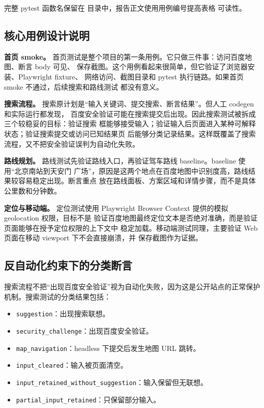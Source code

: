\documentclass[UTF8,a4paper,12pt]{ctexart}
\begin{document}
完整 pytest 函数名保留在  目录中，报告正文使用用例编号提高表格
可读性。

\subsection{核心用例设计说明}

\textbf{首页 smoke。}
首页测试是整个项目的第一条用例。它只做三件事：访问百度地图、断言 body 可见、
保存截图。这个用例看起来很简单，但它验证了浏览器安装、Playwright fixture、
网络访问、截图目录和 pytest 执行链路。如果首页 smoke 不通过，后续搜索和路线测试
都没有意义。

\textbf{搜索流程。}
搜索原计划是“输入关键词、提交搜索、断言结果”。但人工 codegen 和实际运行都发现，
百度安全验证可能在搜索提交后出现。因此搜索测试被拆成三个较稳妥的目标：验证搜索
框能够接受输入；验证输入后页面进入某种可解释状态；验证搜索提交或访问已知结果页
后能够分类记录结果。这样既覆盖了搜索流程，又不把安全验证误判为自动化失败。

\textbf{路线规划。}
路线测试先验证路线入口，再验证驾车路线 baseline。baseline 使用“北京南站到天安门
广场”，原因是这两个地点在百度地图中识别度高，路线结果较容易稳定出现。断言重点
放在路线面板、方案区域和详情步骤，而不是具体公里数和分钟数。

\textbf{定位与移动端。}
定位测试使用 Playwright Browser Context 提供的模拟 geolocation 权限，目标不是
验证百度地图最终定位文本是否绝对准确，而是验证页面能够在授予定位权限的上下文中
稳定加载。移动端测试同理，主要验证 Web 页面在移动 viewport 下不会直接崩溃，并
保存截图作为证据。

\subsection{反自动化约束下的分类断言}

搜索流程不把“出现百度安全验证”视为自动化失败，因为这是公开站点的正常保护
机制。搜索测试的分类结果包括：

\begin{itemize}
  \item \texttt{suggestion}：出现搜索联想。
  \item \texttt{security\_challenge}：出现百度安全验证。
  \item \texttt{map\_navigation}：headless 下提交后发生地图 URL 跳转。
  \item \texttt{input\_cleared}：输入被页面清空。
  \item \texttt{input\_retained\_without\_suggestion}：输入保留但无联想。
  \item \texttt{partial\_input\_retained}：只保留部分输入。
\end{itemize}
\end{document}
